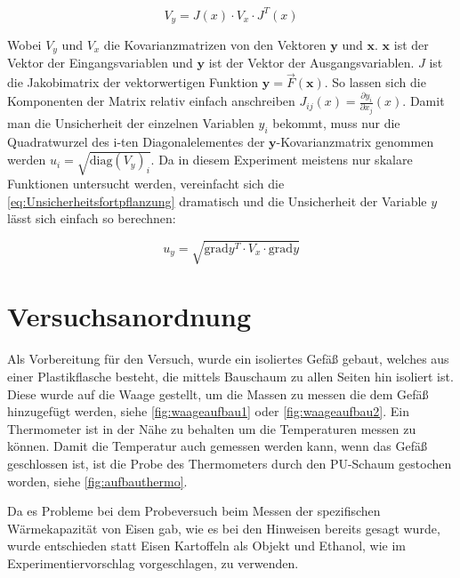 \documentclass[11pt, ngerman]{scrartcl}
\begin{document}
\begin{equation}
	\label{eq:Unsicherheitsfortpflanzung}
	V_y = J(x) \cdot V_x \cdot J^{T}(x)
\end{equation}

Wobei $V_y$ und $V_x$ die Kovarianzmatrizen von den Vektoren $\bm{y}$ und $\bm{x}$.
$\bm{x}$ ist der Vektor der Eingangsvariablen und $\bm{y}$ ist der Vektor der Ausgangsvariablen.
$J$ ist die Jakobimatrix der vektorwertigen Funktion $\bm{y} = \vec{F}(\bm{x})$.
So lassen sich die Komponenten der Matrix relativ einfach anschreiben $J_{ij}(x) = \frac{\partial{y_i}}{\partial{x_j}}(x)$.
Damit man die Unsicherheit der einzelnen Variablen $y_i$ bekommt, muss nur die Quadratwurzel des i-ten Diagonalelementes der
$\bm{y}$-Kovarianzmatrix genommen werden $u_i= \sqrt{\mathrm{diag}(V_y)_i}$.
Da in diesem Experiment meistens nur skalare Funktionen untersucht werden, vereinfacht
sich die \autoref{eq:Unsicherheitsfortpflanzung} dramatisch und die Unsicherheit
der Variable $y$ lässt sich einfach so berechnen:

\begin{equation}
	\label{eq:graduncentainty}
	u_y = \sqrt{\mathrm{grad} y^T \cdot V_x \cdot \mathrm{grad} y}
\end{equation}

\section{Versuchsanordnung}
\label{sec:versuchsanordnung}

Als Vorbereitung für den Versuch, wurde ein isoliertes Gefäß gebaut, welches
aus einer Plastikflasche besteht, die mittels Bauschaum zu allen Seiten hin
isoliert ist. Diese wurde auf die Waage gestellt, um die Massen
zu messen die dem Gefäß hinzugefügt werden, siehe \autoref{fig:waageaufbau1} oder \autoref{fig:waageaufbau2}. Ein Thermometer ist in
der Nähe zu behalten um die Temperaturen messen zu können.
Damit die Temperatur auch gemessen werden kann, wenn das Gefäß geschlossen
ist, ist die Probe des Thermometers durch den PU-Schaum gestochen worden, siehe
\autoref{fig:aufbauthermo}.


Da es Probleme bei dem Probeversuch beim Messen der spezifischen Wärmekapazität
von Eisen gab, wie es bei den Hinweisen \cite{wärmehinweise} bereits gesagt wurde, wurde entschieden statt Eisen
Kartoffeln als Objekt und Ethanol, wie im Experimentiervorschlag vorgeschlagen,
zu verwenden.
\end{document}
